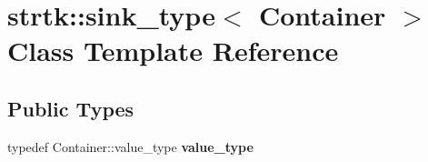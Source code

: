 \hypertarget{classstrtk_1_1sink__type}{\section{strtk\-:\-:sink\-\_\-type$<$ Container $>$ Class Template Reference}
\label{classstrtk_1_1sink__type}
}
\subsection*{Public Types}
\begin{DoxyCompactItemize}
\item 
\hypertarget{classstrtk_1_1sink__type_aad4bea50cf53058ba56b77fabeabe066}{typedef Container\-::value\-\_\-type {\bfseries value\-\_\-type}}\label{classstrtk_1_1sink__type_aad4bea50cf53058ba56b77fabeabe066}

\end{DoxyCompactItemize}
